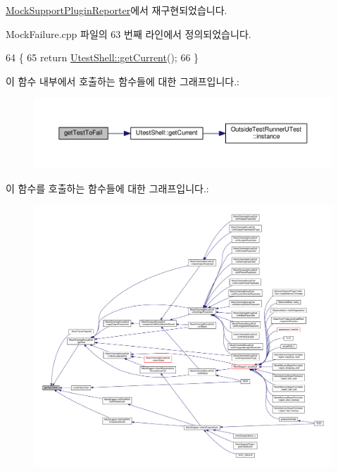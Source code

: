 \hyperlink{class_mock_support_plugin_reporter_a513e89c3b0af8a37fd8b9d6736379793}{Mock\+Support\+Plugin\+Reporter}에서 재구현되었습니다.



Mock\+Failure.\+cpp 파일의 63 번째 라인에서 정의되었습니다.


\begin{DoxyCode}
64 \{
65     \textcolor{keywordflow}{return} \hyperlink{class_utest_shell_afeb97f1f06324a42444c71b412655122}{UtestShell::getCurrent}();
66 \}
\end{DoxyCode}


이 함수 내부에서 호출하는 함수들에 대한 그래프입니다.\+:
\nopagebreak
\begin{figure}[H]
\begin{center}
\leavevmode
\includegraphics[width=350pt]{class_mock_failure_reporter_ae3f75fac53b4d3395e02ee8eca858422_cgraph}
\end{center}
\end{figure}




이 함수를 호출하는 함수들에 대한 그래프입니다.\+:
\nopagebreak
\begin{figure}[H]
\begin{center}
\leavevmode
\includegraphics[width=350pt]{class_mock_failure_reporter_ae3f75fac53b4d3395e02ee8eca858422_icgraph}
\end{center}
\end{figure}




